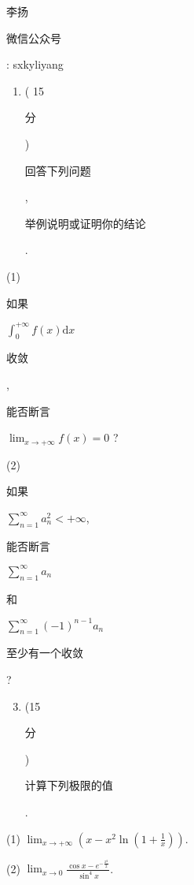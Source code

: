 \documentclass[10pt]{article}
\begin{document}
\begin{CJK}{UTF8}{mj}李扬\end{CJK}

\begin{CJK}{UTF8}{mj}微信公众号\end{CJK}: sxkyliyang

\begin{enumerate}
  \item ( 15 \begin{CJK}{UTF8}{mj}分\end{CJK}) \begin{CJK}{UTF8}{mj}回答下列问题\end{CJK}, \begin{CJK}{UTF8}{mj}举例说明或证明你的结论\end{CJK}.
\end{enumerate}
(1) \begin{CJK}{UTF8}{mj}如果\end{CJK} $\int_{0}^{+\infty} f(x) \mathrm{d} x$ \begin{CJK}{UTF8}{mj}收敛\end{CJK}, \begin{CJK}{UTF8}{mj}能否断言\end{CJK} $\lim _{x \rightarrow+\infty} f(x)=0$ ?

(2) \begin{CJK}{UTF8}{mj}如果\end{CJK} $\sum_{n=1}^{\infty} a_{n}^{2}<+\infty$, \begin{CJK}{UTF8}{mj}能否断言\end{CJK} $\sum_{n=1}^{\infty} a_{n}$ \begin{CJK}{UTF8}{mj}和\end{CJK} $\sum_{n=1}^{\infty}(-1)^{n-1} a_{n}$ \begin{CJK}{UTF8}{mj}至少有一个收敛\end{CJK}?

\begin{enumerate}
  \setcounter{enumi}{2}
  \item (15 \begin{CJK}{UTF8}{mj}分\end{CJK}) \begin{CJK}{UTF8}{mj}计算下列极限的值\end{CJK}.
\end{enumerate}
(1) $\lim _{x \rightarrow+\infty}\left(x-x^{2} \ln \left(1+\frac{1}{x}\right)\right)$.

(2) $\lim _{x \rightarrow 0} \frac{\cos x-e^{-\frac{x^{2}}{2}}}{\sin ^{4} x}$.
\end{document}
